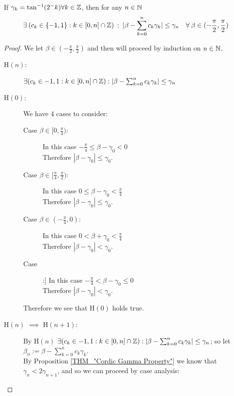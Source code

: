 {%
\begin{Cordic Accuracy}
\label{THM_"Cordic Accuracy"}
If \(\gamma_k = \tan^{-1}(2^-k) \forall k \in \mathbb{Z}\), then for any \(n \in \mathbb{N}\) 
\[\exists \: (c_k\in \{-1,1\} : k \in [0,n] \cap \mathbb{Z}) \: : \: |\beta - \sum_{k=0}^nc_k\gamma_k| \le \gamma_n \quad \forall \: \beta \in (-\frac{\pi}{2}, \frac{\pi}{2})\]
\end{Cordic Accuracy}
\begin{proof}
We let \(\beta \in (-\frac{\pi}{2}, \frac{\pi}{2})\) and then will proceed by induction on \(n \in \mathbb{N}\).
\begin{description}
\item[\textrm{H\((n)\)}:] 
	\(\exists (c_k \in{-1, 1} : k \in [0, n] \cap \mathbb{Z}) : |\beta - \sum_{k=0}^nc_k\gamma_k| \le \gamma_n\)\\
\item[\textrm{H\((0)\)}:] 
	We have 4 cases to consider:\\
	\begin{description}
	\item[Case \(\beta \in [0, \frac{\pi}{4})\):]
		In this case \(-\frac{\pi}{4} \le \beta - \gamma_0 < 0\)\\
		Therefore \(|\beta - \gamma_0| \le \gamma_0\).
	\item[Case \(\beta \in [\frac{\pi}{4}, \frac{\pi}{2})\):]
		In this case \(0 \le \beta - \gamma_0 < \frac{\pi}{4}\)\\
		Therefore \(|\beta - \gamma_0| \le \gamma_0\).
	\item[Case \(\beta \in (-\frac{\pi}{4}, 0)\):]
		In this case \(0 < \beta + \gamma_0 < \frac{\pi}{4}\)\\
		Therefore \(|\beta - \gamma_0| < \gamma_0\).
	\item[Case \(\beta \in (-\frac{\pi}{2}, -\frac{\pi}{4}]\):]
		In this case \(-\frac{\pi}{4} < \beta - \gamma_0 \le 0\)\\
		Therefore \(|\beta - \gamma_0| < \gamma_0\).
	\end{description}
	Therefore we see that \textrm{H\((0)\)} holds true.
\item[\textrm{H\((n)\) \(\implies\) H\((n+1)\)}:]\hfill\break
	By \textrm{H\((n)\)} \(\exists (c_k \in {-1,1} : k \in [0,n] \cap \mathbb{Z}) : |\beta - \sum_{k=0}^nc_k\gamma_k| \le \gamma_n\); so let \(\beta_n := \beta - \sum_{k=0}^nc_k\gamma_k\).\\
	By Proposition \ref{THM_"Cordic Gamma Property"} we know that \(\gamma_n < 2\gamma_{n+1}\), and so we can proceed by case analysis:
	\begin{description}

\end{description}
\end{description}
\end{proof}}
